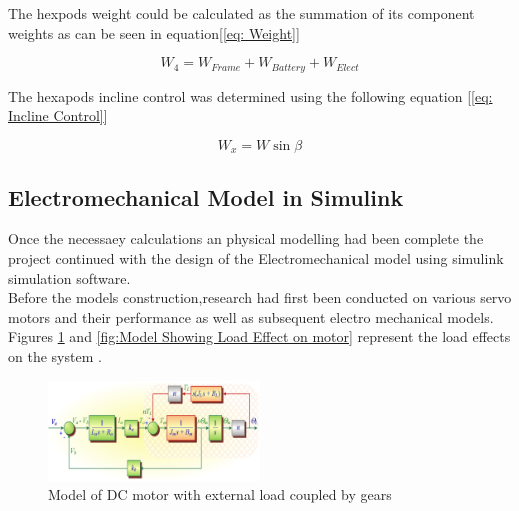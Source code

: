  

The hexpods weight could be calculated as the summation of its component weights as can be seen in equation[\ref{eq: Weight}]

\begin{equation} \label{eq: Weight}
W_4 = W_{Frame}+W_{Battery}+W_{Elect}
\end{equation}


The hexapods incline control was determined using the following equation [\ref{eq: Incline Control}]

\begin{equation} \label{eq: Incline Control}
W_x = W \sin \beta
\end{equation}




\subsection{Electromechanical Model in Simulink}
Once the necessaey calculations an physical modelling had been complete the project continued with the design of the Electromechanical model using simulink simulation software.\\

Before the models construction,research had first been conducted on various servo motors and their performance as well as subsequent electro mechanical models. Figures \ref{fig:Model of DC motor with external load coupled by gears} and \ref{fig:Model Showing Load Effect on motor} represent the load effects on the system .\\

\begin{figure}[h]
 \centering
   \includegraphics[width = 0.5\textwidth]{figures/5.png}                \caption{Model of DC motor with external load coupled by gears}
   \label{fig:Model of DC motor with external load coupled by gears}
\end{figure}

